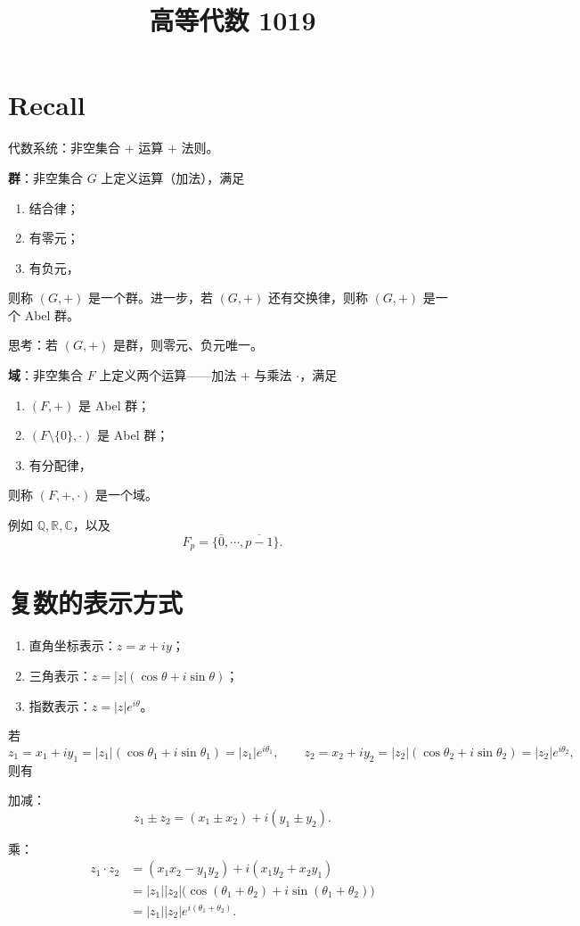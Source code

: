 \documentclass[UTF8,11pt]{ctexart}
\title{高等代数 1019}
\date{}
\theoremstyle{cnthm}
\begin{document}
\maketitle

\section{Recall}

代数系统：非空集合 $+$ 运算 $+$ 法则。

\textbf{群}：非空集合 $G$ 上定义运算（加法），满足
\begin{enumerate}
\item 结合律；
\item 有零元；
\item 有负元，
\end{enumerate}
则称 $(G,+)$ 是一个群。进一步，若 $(G,+)$ 还有交换律，则称 $(G,+)$ 是一个 Abel 群。

思考：若 $(G,+)$ 是群，则零元、负元唯一。

\textbf{域}：非空集合 $F$ 上定义两个运算——加法 $+$ 与乘法 $\cdot$，满足
\begin{enumerate}
\item $(F,+)$ 是 Abel 群；
\item $(F\setminus\{0\},\cdot)$ 是 Abel 群；
\item 有分配律，
\end{enumerate}
则称 $(F,+,\cdot)$ 是一个域。

例如 $\mathbb{Q},\mathbb{R},\mathbb{C}$，以及
\[
F_p=\{\bar{0},\cdots,\overline{p-1}\}.
\]

\section{复数的表示方式}

\begin{enumerate}
\item 直角坐标表示：$z=x+iy$；
\item 三角表示：$z=|z|(\cos\theta+i\sin\theta)$；
\item 指数表示：$z=|z|e^{i\theta}$。
\end{enumerate}

若
\[
z_1=x_1+iy_1=|z_1|(\cos\theta_1+i\sin\theta_1)=|z_1|e^{i\theta_1},
\qquad
z_2=x_2+iy_2=|z_2|(\cos\theta_2+i\sin\theta_2)=|z_2|e^{i\theta_2},
\]
则有

加减：
\[
z_1\pm z_2=(x_1\pm x_2)+i(y_1\pm y_2).
\]

乘：
\[
\begin{aligned}
z_1\cdot z_2&=(x_1x_2-y_1y_2)+i(x_1y_2+x_2y_1)\\
&=|z_1||z_2|\bigl(\cos(\theta_1+\theta_2)+i\sin(\theta_1+\theta_2)\bigr)\\
&=|z_1||z_2|e^{i(\theta_1+\theta_2)}.
\end{aligned}
\]
\end{document}
